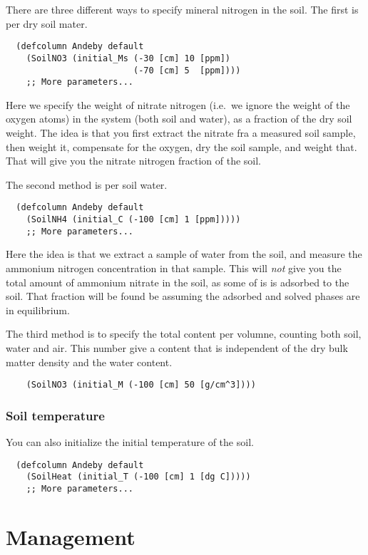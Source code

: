 \documentclass[a4paper,11pt]{article}
\begin{document}
There are three different ways to specify mineral nitrogen in the
soil.  The first is per dry soil mater.  
\begin{verbatim}
  (defcolumn Andeby default
    (SoilNO3 (initial_Ms (-30 [cm] 10 [ppm])
                         (-70 [cm] 5  [ppm])))
    ;; More parameters...
\end{verbatim}
Here we specify the weight of nitrate nitrogen (i.e.\ we ignore the
weight of the oxygen atoms) in the system (both soil and water), as a
fraction of the dry soil weight.  The idea is that you first extract
the nitrate fra a measured soil sample, then weight it, compensate for
the oxygen, dry the soil sample, and weight that.  That will give you
the nitrate nitrogen fraction of the soil.  

The second method is per soil water.
\begin{verbatim}
  (defcolumn Andeby default 
    (SoilNH4 (initial_C (-100 [cm] 1 [ppm]))))
    ;; More parameters...
\end{verbatim}
Here the idea is that we extract a sample of water from the soil, and
measure the ammonium nitrogen concentration in that sample.  This will
\emph{not} give you the total amount of ammonium nitrate in the soil,
as some of is is adsorbed to the soil.  That fraction will be found be
assuming the adsorbed and solved phases are in equilibrium.

The third method is to specify the total content per volumne, counting
both soil, water and air. This number give a content that is
independent of the dry bulk matter density and the water content. 
\begin{verbatim}
    (SoilNO3 (initial_M (-100 [cm] 50 [g/cm^3])))
\end{verbatim}

\subsubsection{Soil temperature}

You can also initialize the initial temperature of the soil.
\begin{verbatim}
  (defcolumn Andeby default 
    (SoilHeat (initial_T (-100 [cm] 1 [dg C]))))
    ;; More parameters...
\end{verbatim}

\section{Management}
\label{sec:management}
\end{document}
